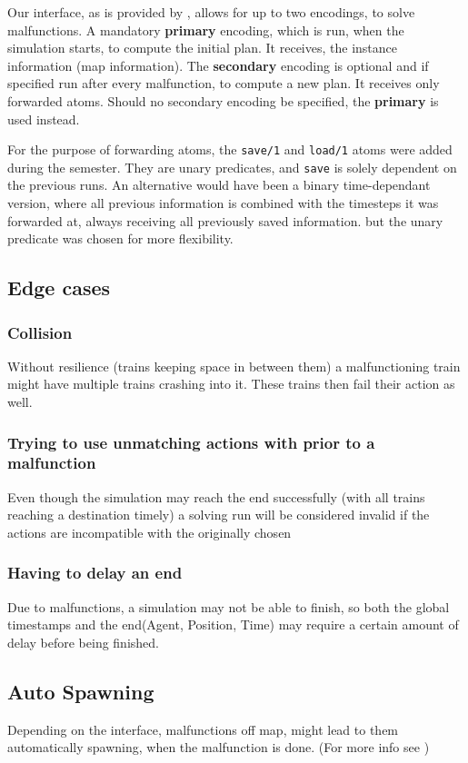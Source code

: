 Our interface, as is provided by \cite{flatland}, allows for up to two encodings, to solve malfunctions. A mandatory \textbf{primary} encoding, which is run, when the simulation starts, to compute the initial plan. It receives, the instance information (map information). The \textbf{secondary} encoding is optional and if specified run after every malfunction, to compute a new plan. It receives only forwarded atoms. Should no secondary encoding be specified, the \textbf{primary} is used instead.

For the purpose of forwarding atoms, the \texttt{save/1} and \texttt{load/1} atoms were added during the semester\cite{malfunction_branch}. They are unary predicates, and \texttt{save} is solely dependent on the previous runs. An alternative would have been a binary time-dependant version, where all previous information is combined with the timesteps it was forwarded at, always receiving all previously saved information. \color{red} but the unary predicate was chosen for more flexibility.\color{black}

\subsection{Edge cases}

\subsubsection {Collision} Without resilience (trains keeping space in between them) a malfunctioning train might have multiple trains crashing into it. These trains then fail their action as well.

\subsubsection {Trying to use unmatching actions with prior to a malfunction} Even though the simulation may reach the end successfully (with all trains reaching a destination timely) a solving run will be considered invalid if the actions are incompatible with the originally chosen

\subsubsection {Having to delay an end} Due to malfunctions, a simulation may not be able to finish, so both the global timestamps and the end(Agent, Position, Time) may require a certain amount of delay before being finished.

\subsection {Auto Spawning} Depending on the interface, malfunctions off map, might lead to them automatically spawning, when the malfunction is done. (For more info see \cite{malfunction_issue})

